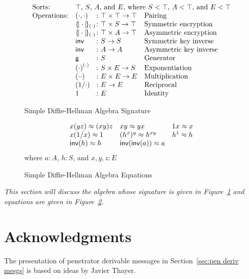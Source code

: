 \documentclass[12pt]{article}
\theoremstyle{definition}
\newcommand{\inv}[1]{\ensuremath{\cn{inv}(#1)}}
\newcommand{\gen}{\ensuremath{\cn{g}}}
\newcommand{\expr}[2]{\ensuremath{{#1}^{#2}}}
\begin{document}
\begin{figure}
$$\begin{array}{ll@{{}\colon{}}ll}
\mbox{Sorts:}&\multicolumn{3}{l}{\mbox{$\top$, $S$, $A$, and $E$,
    where $S<\top$, $A<\top$, and $E<\top$}}\\
\mbox{Operations:}&(\cdot,\cdot)&\top\times\top\to\top& \mbox{Pairing}\\
&\enc{\cdot}{(\cdot)}&\top\times S\to\top& \mbox{Symmetric encryption}\\
&\enc{\cdot}{(\cdot)}&\top\times A\to\top& \mbox{Asymmetric encryption}\\
&\cn{inv}&S\to S& \mbox{Symmetric key inverse}\\
&\cn{inv}&A\to A& \mbox{Asymmetric key inverse}\\
&\gen&S&\mbox{Generator}\\
&\expr{(\cdot)}{(\cdot)}&S\times E\to S&\mbox{Exponentiation}\\
&(\cdot \cdot)& E\times E\to E&\mbox{Multiplication}\\
&(1/\cdot)&E\to E & \mbox{Reciprocal}\\
&1&E & \mbox{Identity}
\end{array}$$
\caption{Simple Diffie-Hellman Algebra Signature}\label{fig:dh signature}
\end{figure}

\begin{figure}
\begin{center}
$$\begin{array}{lll}
x(yz) \approx (xy)z&
xy \approx yx&
1x \approx x\\
x(1/x) \approx 1&
(h^x)^y \approx h^{xy}&
h^1 \approx h\\
\inv{h}\approx h&\inv{\inv{a}}\approx a
\end{array}$$
where $a\colon A$, $h\colon S$, and $x,y,z\colon E$
\end{center}
\caption{Simple Diffie-Hellman Algebra Equations}\label{fig:dh equations}
\end{figure}

\emph{This section will discuss the algebra whose signature is given
  in Figure~\ref{fig:dh signature} and equations are given in
  Figure~\ref{fig:dh equations}.}

\section*{Acknowledgments}

The presentation of penetrator derivable messages in
Section~\ref{sec:pen deriv mesgs} is based on ideas by Javier Thayer.



\end{document}

